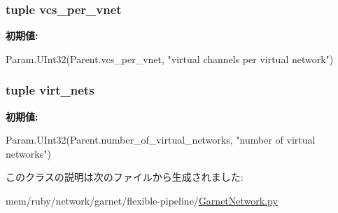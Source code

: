 \label{classGarnetNetwork_1_1GarnetNetworkInterface_acce15679d830831b0bbe8ebc2a60b2ca}
\hypertarget{classGarnetNetwork_1_1GarnetNetworkInterface_a2bb2221cda9b94b6a0c2944d8a12f31e}{
\subsubsection[{vcs\_\-per\_\-vnet}]{\setlength{\rightskip}{0pt plus 5cm}tuple {\bf vcs\_\-per\_\-vnet}}}
\label{classGarnetNetwork_1_1GarnetNetworkInterface_a2bb2221cda9b94b6a0c2944d8a12f31e}
{\bfseries 初期値:}
\begin{DoxyCode}
Param.UInt32(Parent.vcs_per_vnet,
                             "virtual channels per virtual network")
\end{DoxyCode}
\hypertarget{classGarnetNetwork_1_1GarnetNetworkInterface_a84c7a415611bc1b55aa5e7fd9e9601e8}{
\subsubsection[{virt\_\-nets}]{\setlength{\rightskip}{0pt plus 5cm}tuple {\bf virt\_\-nets}}}
\label{classGarnetNetwork_1_1GarnetNetworkInterface_a84c7a415611bc1b55aa5e7fd9e9601e8}
{\bfseries 初期値:}
\begin{DoxyCode}
Param.UInt32(Parent.number_of_virtual_networks,
                          "number of virtual networks")
\end{DoxyCode}


このクラスの説明は次のファイルから生成されました:\begin{DoxyCompactItemize}
\item 
mem/ruby/network/garnet/flexible-\/pipeline/\hyperlink{GarnetNetwork_8py}{GarnetNetwork.py}\end{DoxyCompactItemize}
